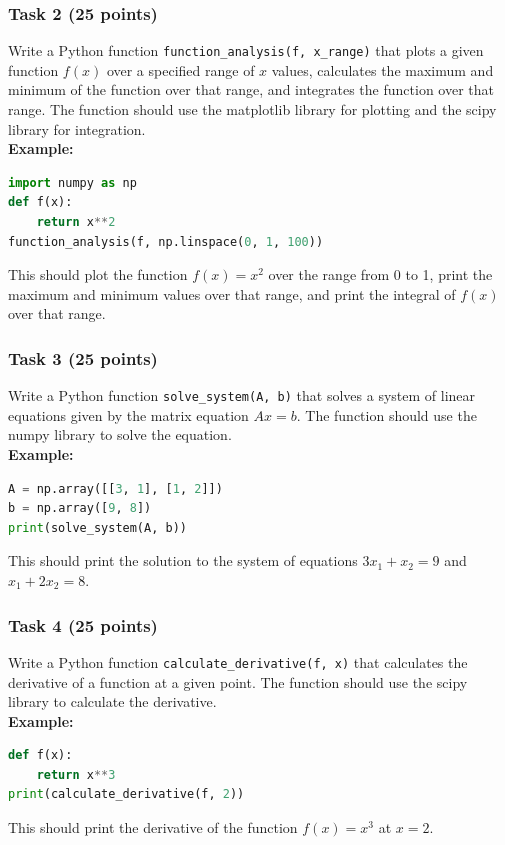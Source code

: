\documentclass[12pt]{book}
\begin{document}
\subsubsection{Task 2 (25 points)}
Write a Python function \texttt{function\_analysis(f, x\_range)} that plots a given function $f(x)$ over a specified range of $x$ values, calculates the maximum and minimum of the function over that range, and integrates the function over that range. The function should use the matplotlib library for plotting and the scipy library for integration. \\
\textbf{Example:}
\begin{lstlisting}[language=Python]
import numpy as np
def f(x):
    return x**2
function_analysis(f, np.linspace(0, 1, 100))
\end{lstlisting}
This should plot the function $f(x) = x^2$ over the range from 0 to 1, print the maximum and minimum values over that range, and print the integral of $f(x)$ over that range.

\subsubsection{Task 3 (25 points)}
Write a Python function \texttt{solve\_system(A, b)} that solves a system of linear equations given by the matrix equation $Ax = b$. The function should use the numpy library to solve the equation. \\
\textbf{Example:}
\begin{lstlisting}[language=Python]
A = np.array([[3, 1], [1, 2]])
b = np.array([9, 8])
print(solve_system(A, b))
\end{lstlisting}
This should print the solution to the system of equations $3x_1 + x_2 = 9$ and $x_1 + 2x_2 = 8$.

\subsubsection{Task 4 (25 points)}
Write a Python function \texttt{calculate\_derivative(f, x)} that calculates the derivative of a function at a given point. The function should use the scipy library to calculate the derivative. \\
\textbf{Example:}
\begin{lstlisting}[language=Python]
def f(x):
    return x**3
print(calculate_derivative(f, 2))
\end{lstlisting}
This should print the derivative of the function $f(x) = x^3$ at $x = 2$.
\newpage
\end{document}
